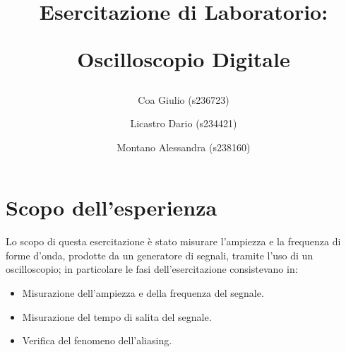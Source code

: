 \documentclass[a4paper]{article}
\title{
		\begin{center}
			Esercitazione di Laboratorio:
		\end{center}
		\newline
		\begin{center}
			Oscilloscopio Digitale
		\end{center}
	}
\author{
	Coa Giulio (s236723)
	\and
	Licastro Dario (s234421)
	\and
	Montano Alessandra (s238160)
}
\begin{document}
	\begin{titlingpage}
		\maketitle
	\end{titlingpage}
	\newpage
	\section{Scopo dell'esperienza}
		Lo scopo di questa esercitazione è stato misurare l'ampiezza e la frequenza di forme d’onda, prodotte da un generatore di segnali, tramite l’uso di un oscilloscopio; in particolare le fasi dell'esercitazione consistevano in:
		\begin{itemize}
			\item Misurazione dell'ampiezza e della frequenza del segnale.
			\item Misurazione del tempo di salita del segnale.
			\item Verifica del fenomeno dell’aliasing.
		\end{itemize}
\end{document}
